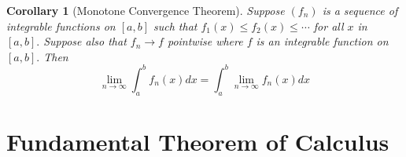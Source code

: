 \documentclass[12pt]{article}
\newtheorem{corollary}{Corollary}[theorem]
\begin{document}
\begin{corollary}[Monotone Convergence Theorem]
	Suppose $\left( f _ { n } \right)$ is a sequence of integrable functions on $[ a , b ]$ such that
	$f _ { 1 } ( x ) \leq f _ { 2 } ( x ) \leq \cdots$ for all $x$ in $[ a , b ] .$ Suppose also that $f _ { n } \rightarrow f$
	pointwise where $f$ is an integrable function on $[ a , b ] .$ Then $$
	\lim _ { n \rightarrow \infty } \int _ { a } ^ { b } f _ { n } ( x ) d x = \int _ { a } ^ { b } \lim _ { n \rightarrow \infty } f _ { n } ( x ) d x
	$$
\end{corollary}

\section{Fundamental Theorem of Calculus}
\end{document}

